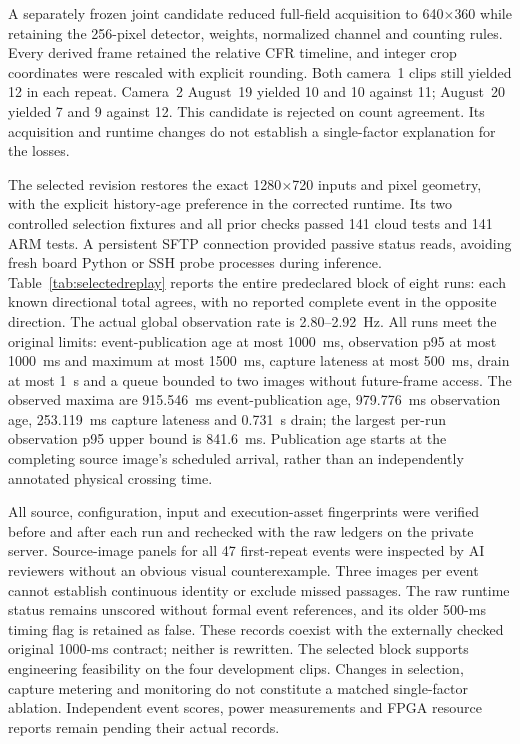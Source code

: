 \documentclass[journal]{IEEEtran}
\begin{document}
A separately frozen joint candidate reduced full-field acquisition to 640$\times$360 while retaining the 256-pixel detector, weights, normalized channel and counting rules. Every derived frame retained the relative CFR timeline, and integer crop coordinates were rescaled with explicit rounding. Both camera~1 clips still yielded 12 in each repeat. Camera~2 August~19 yielded 10 and 10 against 11; August~20 yielded 7 and 9 against 12. This candidate is rejected on count agreement. Its acquisition and runtime changes do not establish a single-factor explanation for the losses.

The selected revision restores the exact 1280$\times$720 inputs and pixel geometry, with the explicit history-age preference in the corrected runtime. Its two controlled selection fixtures and all prior checks passed 141 cloud tests and 141 ARM tests. A persistent SFTP connection provided passive status reads, avoiding fresh board Python or SSH probe processes during inference. Table~\ref{tab:selectedreplay} reports the entire predeclared block of eight runs: each known directional total agrees, with no reported complete event in the opposite direction. The actual global observation rate is 2.80--2.92~Hz. All runs meet the original limits: event-publication age at most 1000~ms, observation p95 at most 1000~ms and maximum at most 1500~ms, capture lateness at most 500~ms, drain at most 1~s and a queue bounded to two images without future-frame access. The observed maxima are 915.546~ms event-publication age, 979.776~ms observation age, 253.119~ms capture lateness and 0.731~s drain; the largest per-run observation p95 upper bound is 841.6~ms. Publication age starts at the completing source image's scheduled arrival, rather than an independently annotated physical crossing time.

All source, configuration, input and execution-asset fingerprints were verified before and after each run and rechecked with the raw ledgers on the private server. Source-image panels for all 47 first-repeat events were inspected by AI reviewers without an obvious visual counterexample. Three images per event cannot establish continuous identity or exclude missed passages. The raw runtime status remains unscored without formal event references, and its older 500-ms timing flag is retained as false. These records coexist with the externally checked original 1000-ms contract; neither is rewritten. The selected block supports engineering feasibility on the four development clips. Changes in selection, capture metering and monitoring do not constitute a matched single-factor ablation. Independent event scores, power measurements and FPGA resource reports remain pending their actual records.
\end{document}
